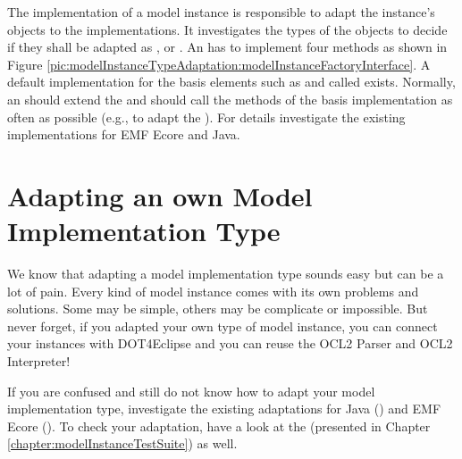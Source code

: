 The  implementation of a model instance is responsible to adapt the instance's objects to the  implementations. It investigates the types of the objects to decide if they shall be adapted as ,  or . An  has to implement four methods as shown in Figure \ref{pic:modelInstanceTypeAdaptation:modelInstanceFactoryInterface}. A default implementation for the basis elements such as  and  called  exists. Normally, an  should extend the  and should call the methods of the basis implementation as often as possible (e.g., to adapt the ). For details investigate the existing implementations for \acs{EMF} Ecore and Java.



\section{Adapting an own Model Implementation Type}

We know that adapting a model implementation type sounds easy but can be a lot of pain. Every kind of model instance comes with its own problems and solutions. Some may be simple, others may be complicate or impossible. But never forget, if you adapted your own type of model instance, you can connect your instances with \acl{DOT4Eclipse} and you can reuse the \acs{OCL}2 Parser and \acs{OCL}2 Interpreter! 

If you are confused and still do not know how to adapt your model implementation type, investigate the existing adaptations for Java () and \acs{EMF} Ecore (). To check your adaptation, have a look at the  (presented in Chapter \ref{chapter:modelInstanceTestSuite}) as well.